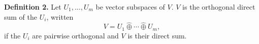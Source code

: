 \textbf{Definition 2.} Let $U_1, \ldots, U_m$ be vector subspaces of $V$. $V$ is the orthogonal direct sum of the $U_i$, written
$$V = U_1 \hat{\oplus} \cdots \hat{\oplus} U_m,$$
if the $U_i$ are pairwise orthogonal and $V$ is their direct sum.
